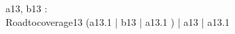 \begin{circus}
\circchannel a13, b13 : \nat \\
\circprocess Roadtocoverage13 \circdef \circbegin
	\circspot
	    (a13.1 \then \Skip \lpar | \lchanset b13 \rchanset | \rpar a13.1 \then \Skip) \lpar | \lchanset a13 \rchanset | \rpar a13.1 \then \Skip \\
	\circend
\end{circus}
